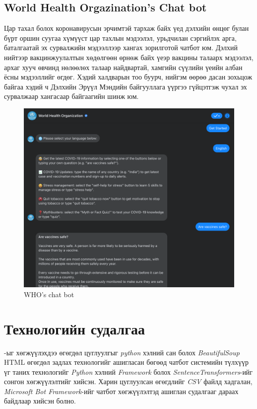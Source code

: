 \subsection{World Health Orgazination's Chat bot}
Цар тахал болох коронавирусын эрчимтэй тархаж байх үед дэлхийн өнцөг булан бүрт оршин суугаа хүмүүст цар тахлын мэдээлэл, урьдчилан сэргийлэх арга, баталгаатай эх сурвалжийн мэдээллээр хангах зорилготой чатбот юм.
Дэлхий нийтээр вакцинжуулалтын хөдөлгөөн өрнөж байх үеэр вакцины талаарх мэдээлэл, архаг хууч өвчинд нөлөөлөх талаар найдвартай, хамгийн сүүлийн үеийн албан ёсны мэдээллийг өгдөг. Хэдий халдварын тоо буурч, нийгэм өөрөө дасан зохьцож байгаа хэдий ч Дэлхийн Эрүүл Мэндийн байгууллага үүргээ гүйцэтгэж чухал эх сурвалжаар хангасаар байгаагийн шинж юм. 
\begin{figure}[ht]
  \centering
  \includegraphics[width=\textwidth-4cm]{images/whoBOT.png}
  \caption{WHO's chat bot}
\end{figure}
\section{Технологийн судалгаа}
\@title-ыг хөгжүүлэхдээ өгөгдөл цуглуулгыг \textit{python} хэлний сан болох \textit{BeautifulSoup} HTML өгөгдөл задлах технологийг ашигласан бөгөөд чатбот системийн түлхүүр үг таних технологийг \textit{Python} хэлний \textit{Framework} болох \textit{SentenceTransformers}-ийг сонгон хөгжүүлэлтийг хийсэн. Харин цуглуулсан өгөгдлийг \textit{CSV} файлд хадгалан, \textit{Microsoft Bot Framework}-ийг чатбот хөгжүүлэлтэд ашиглан судалгааг дараах байдлаар хийсэн болно. 
